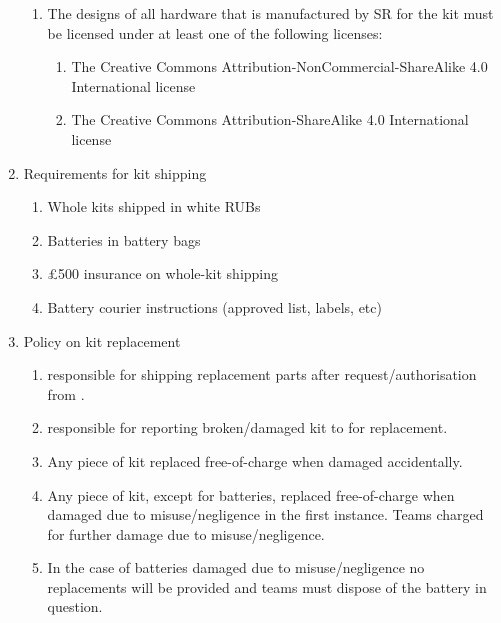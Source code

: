 \begin{enumerate}
\begin{enumerate}
  \item The designs of all hardware that is manufactured by SR for the kit must be licensed under at least one of the following licenses:
    \begin{enumerate}
    \item The Creative Commons Attribution-NonCommercial-ShareAlike 4.0 International license
    \item The Creative Commons Attribution-ShareAlike 4.0 International license
    \end{enumerate}
  \end{enumerate}


\item Requirements for kit shipping
  \begin{enumerate}
    \item{Whole kits shipped in white RUBs}
    \item{Batteries in battery bags}
    \item{\pounds500 insurance on whole-kit shipping}
    \item{Battery courier instructions (approved list, labels, etc)}
  \end{enumerate}
\item Policy on kit replacement
  \begin{enumerate}
    \item{ responsible for shipping replacement parts after request/authorisation from .}
    \item{ responsible for reporting broken/damaged kit to  for replacement.}
    \item{Any piece of kit replaced free-of-charge when damaged accidentally.}
    \item{Any piece of kit, except for batteries, replaced free-of-charge when damaged due to misuse/negligence in the first instance. Teams charged for further damage due to misuse/negligence.}
    \item{In the case of batteries damaged due to misuse/negligence no replacements will be provided and teams must dispose of the battery in question.}
  \end{enumerate}

\end{enumerate}
